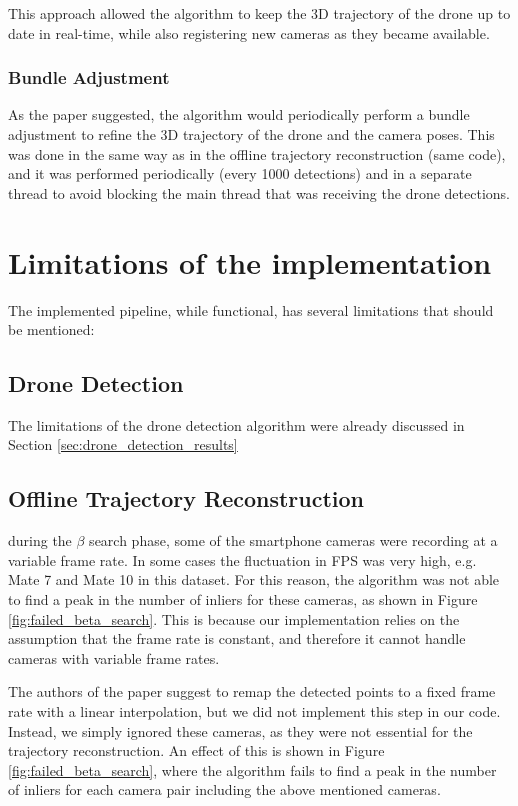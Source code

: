 \documentclass[11pt]{article}
\begin{document}
This approach allowed the algorithm to keep the 3D trajectory of the drone up to date in real-time, while also registering new cameras as they became available.

\subsubsection{Bundle Adjustment}

As the paper suggested, the algorithm would periodically perform a bundle adjustment to refine the 3D trajectory of the drone and the camera poses. This was done in the same way as in the offline trajectory reconstruction (same code), and it was performed periodically (every 1000 detections) and in a separate thread to avoid blocking the main thread that was receiving the drone detections.

\section{Limitations of the implementation}
\label{sec:limitations}

The implemented pipeline, while functional, has several limitations that should be mentioned:

\subsection{Drone Detection}

The limitations of the drone detection algorithm were already discussed in Section \ref{sec:drone_detection_results}

\subsection{Offline Trajectory Reconstruction}

during the $\beta$ search phase, some of the smartphone cameras were recording at a variable frame rate. In some cases the fluctuation in FPS was very high, e.g. Mate 7 and Mate 10 in this dataset. For this reason, the algorithm was not able to find a peak in the number of inliers for these cameras, as shown in Figure \ref{fig:failed_beta_search}. This is because our implementation relies on the assumption that the frame rate is constant, and therefore it cannot handle cameras with variable frame rates.

The authors of the paper suggest to remap the detected points to a fixed frame rate with a linear interpolation, but we did not implement this step in our code. Instead, we simply ignored these cameras, as they were not essential for the trajectory reconstruction. An effect of this is shown in Figure \ref{fig:failed_beta_search}, where the algorithm fails to find a peak in the number of inliers for each camera pair including the above mentioned cameras.
\end{document}
